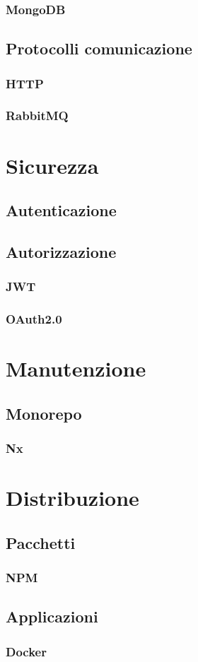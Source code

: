 \subsubsection{MongoDB}
\kant[5]

\subsection{Protocolli comunicazione}
\subsubsection{HTTP}
\kant[5]

\subsubsection{RabbitMQ}
\kant[5]

\section{Sicurezza}
\subsection{Autenticazione}
\kant[5]

\subsection{Autorizzazione}
\kant[5]

\subsubsection{JWT}
\kant[5]

\subsubsection{OAuth2.0}
\kant[5]

\section{Manutenzione}
\subsection{Monorepo}
\kant[5]
\subsubsection{Nx}
\kant[5]

\section{Distribuzione}

\subsection{Pacchetti}
\kant[5]
\subsubsection{NPM}
\kant[5]

\subsection{Applicazioni}
\kant[5]
\subsubsection{Docker}
\kant[5]
